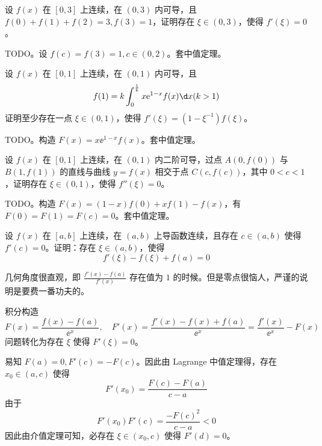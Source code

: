 \begin{problem}[000011]
设 $f(x)$ 在 $[0, 3]$ 上连续，在 $(0, 3)$ 内可导，且 $f(0) + f(1) + f(2) = 3, f(3) = 1$，证明存在 $\xi \in (0, 3)$，使得 $f'(\xi) = 0$。
\end{problem}

\begin{solution}
	TODO。设 $f(c) = f(3) = 1, c \in (0, 2)$。套中值定理。
\end{solution}

\begin{problem}[000012]
设 $f(x)$ 在 $[0, 1]$ 上连续，在 $(0, 1)$ 内可导，且
\[ f(1) = k \int_{0}^{\frac{1}{k}} x \ee^{1-x} f(x) \d x (k > 1) \]
证明至少存在一点 $\xi \in (0, 1)$，使得 $f'(\xi) = (1 - \xi^{-1})f(\xi)$。
\end{problem}

\begin{solution}
	TODO。构造 $F(x) = x \ee^{1-x} f(x)$。套中值定理。
\end{solution}

\begin{problem}[000013]
设 $f(x)$ 在 $[0, 1]$ 上连续，在 $(0, 1)$ 内二阶可导，过点 $A(0, f(0))$ 与 $B(1, f(1))$ 的直线与曲线 $y=f(x)$ 相交于点 $C(c, f(c))$，其中 $0 < c < 1$，证明存在 $\xi \in (0, 1)$，使得 $f''(\xi) = 0$。
\end{problem}

\begin{solution}
	TODO。构造 $F(x) = (1-x)f(0) + xf(1) - f(x)$，有 $F(0) = F(1) = F(c) = 0$。套中值定理。
\end{solution}

\begin{problem}[000016]
设 $f(x)$ 在 $[a, b]$ 上连续，在 $(a, b)$ 上导函数连续，且存在 $c \in (a, b)$ 使得 $f'(c) = 0$。证明：存在 $\xi \in (a, b)$，使得
\[ f'(\xi) - f(\xi) + f(a) = 0 \]
\end{problem}

\begin{solution}
	几何角度很直观，即 $\frac{f'(x) - f(a)}{f'(x)}$ 存在值为 $1$ 的时候。但是零点很恼人，严谨的说明是要费一番功夫的。

	积分构造
	\[ F(x) = \frac{f(x) - f(a)}{\ee^x}, \quad F'(x) = \frac{f'(x) - f(x) + f(a)}{\ee^x} = \frac{f'(x)}{\ee^x} - F(x) \]
	问题转化为存在 $\xi$ 使得 $F'(\xi) = 0$。

	易知 $F(a) = 0, F'(c) = -F(c)$。因此由 Lagrange 中值定理得，存在 $x_0 \in (a, c)$ 使得
	\[ F'(x_0) = \frac{F(c) - F(a)}{c - a} \]
	由于
	\[ F'(x_0) F'(c) = \frac{-F(c)^2}{c- a} < 0 \]
	因此由介值定理可知，必存在 $\xi \in (x_0, c)$ 使得 $F'(d) = 0$。
\end{solution}

